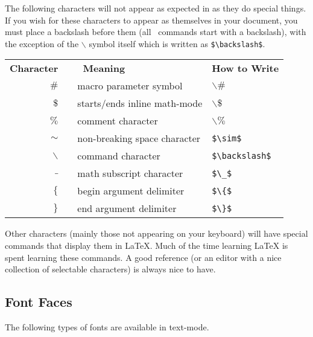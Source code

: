 \documentclass[letterpaper,twoside,10pt]{article}
\begin{document}
The following characters will not appear as expected in {\LaTeXe} as they do special things. If you wish for these characters to appear as themselves in your document, you must place a backslash before them (all \LaTeXe\ commands start with a backslash), with the exception of the $\backslash$ symbol itself which is written as \verb!$\backslash$!.
\begin{center}
\begin{tabular}{rcll}
	\textbf{Character} & \quad & \textbf{\LaTeXe\ Meaning} & \textbf{How to Write}\\
	$\#$ & & macro parameter symbol & $\backslash\#$\\
	$\$$ & & starts/ends inline math-mode & $\backslash\$$\\
	$\%$ & & comment character & $\backslash\%$\\
	$\sim$ & & non-breaking space character & \verb!$\sim$!\\
	$\backslash$ & & command character & \verb!$\backslash$!\\
	$\_$ & & math subscript character & \verb!$\_$!\\
	$\{$ & & begin argument delimiter & \verb!$\{$!\\
	$\}$ & & end argument delimiter & \verb!$\}$!
\end{tabular}
\end{center}

Other characters (mainly those not appearing on your keyboard) will have special commands that display them in {\LaTeX}. Much of the time learning {\LaTeX} is spent learning these commands. A good reference (or an editor with a nice collection of selectable characters) is always nice to have.

\subsection{Font Faces}

The following types of fonts are available in text-mode.
\end{document}
